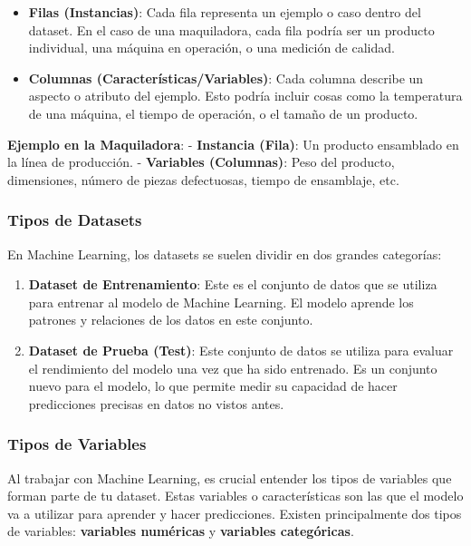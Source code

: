\documentclass[
  10pt,
  letterpaper,
]{book}
\providecommand{\tightlist}{%
  \setlength{\itemsep}{0pt}\setlength{\parskip}{0pt}}\usepackage{longtable,booktabs,array}
\begin{document}
\begin{itemize}
\tightlist
\item
  \textbf{Filas (Instancias)}: Cada fila representa un ejemplo o caso
  dentro del dataset. En el caso de una maquiladora, cada fila podría
  ser un producto individual, una máquina en operación, o una medición
  de calidad.
\item
  \textbf{Columnas (Características/Variables)}: Cada columna describe
  un aspecto o atributo del ejemplo. Esto podría incluir cosas como la
  temperatura de una máquina, el tiempo de operación, o el tamaño de un
  producto.
\end{itemize}

\textbf{Ejemplo en la Maquiladora}: - \textbf{Instancia (Fila)}: Un
producto ensamblado en la línea de producción. - \textbf{Variables
(Columnas)}: Peso del producto, dimensiones, número de piezas
defectuosas, tiempo de ensamblaje, etc.

\subsubsection{Tipos de Datasets}\label{tipos-de-datasets}

En Machine Learning, los datasets se suelen dividir en dos grandes
categorías:

\begin{enumerate}
\def\labelenumi{\arabic{enumi}.}
\item
  \textbf{Dataset de Entrenamiento}: Este es el conjunto de datos que se
  utiliza para entrenar al modelo de Machine Learning. El modelo aprende
  los patrones y relaciones de los datos en este conjunto.
\item
  \textbf{Dataset de Prueba (Test)}: Este conjunto de datos se utiliza
  para evaluar el rendimiento del modelo una vez que ha sido entrenado.
  Es un conjunto nuevo para el modelo, lo que permite medir su capacidad
  de hacer predicciones precisas en datos no vistos antes.
\end{enumerate}

\subsubsection{Tipos de Variables}\label{tipos-de-variables}

Al trabajar con Machine Learning, es crucial entender los tipos de
variables que forman parte de tu dataset. Estas variables o
características son las que el modelo va a utilizar para aprender y
hacer predicciones. Existen principalmente dos tipos de variables:
\textbf{variables numéricas} y \textbf{variables categóricas}.
\end{document}
